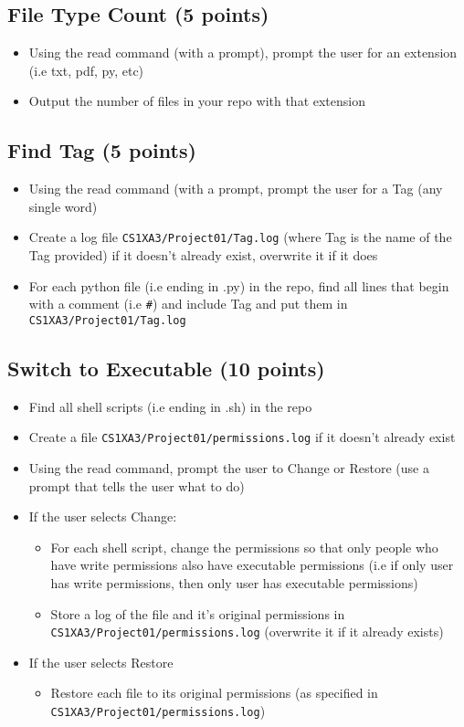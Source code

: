 \documentclass[11pt]{article}
\begin{document}
\subsection{File Type Count (5 points)}
\label{sec:org03812b2}
\begin{itemize}
\item Using the read command (with a prompt), prompt the user for an extension
(i.e txt, pdf, py, etc)
\item Output the number of files in your repo with that extension
\end{itemize}
\subsection{Find Tag (5 points)}
\label{sec:orge952576}
\begin{itemize}
\item Using the read command (with a prompt, prompt the user for a Tag (any
single word)
\item Create a log file \texttt{CS1XA3/Project01/Tag.log} (where Tag is the name of the
Tag provided) if it doesn't already exist, overwrite it if it does
\item For each python file (i.e ending in {\color{purple}.py}) in the repo, find all lines
that begin with a comment (i.e \texttt{\#}) and include Tag and put them in \texttt{CS1XA3/Project01/Tag.log}
\end{itemize}
\subsection{Switch to Executable (10 points)}
\label{sec:org06f0007}
\begin{itemize}
\item Find all shell scripts (i.e ending in {\color{purple}.sh}) in the repo
\item Create a file \texttt{CS1XA3/Project01/permissions.log} if it doesn't already exist
\item Using the read command, prompt the user to {\color{purple}Change} or
{\color{purple}Restore} (use a prompt that tells the user what to do)
\item If the user selects {\color{purple}Change}:
\begin{itemize}
\item For each shell script, change the permissions so that only people who
have write permissions also have executable permissions (i.e if only
user has write permissions, then only user has executable permissions)
\item Store a log of the file and it's original permissions in
\texttt{CS1XA3/Project01/permissions.log} (overwrite it if it already exists)
\end{itemize}
\item If the user selects {\color{purple}Restore}
\begin{itemize}
\item Restore each file to its original permissions (as specified in
\texttt{CS1XA3/Project01/permissions.log})
\end{itemize}
\end{itemize}
\end{document}
